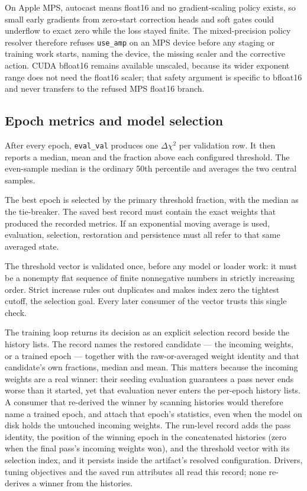 \documentclass[10pt,aps,prd,twocolumn,nofootinbib]{revtex4-2}
\newcommand{\code}[1]{\texttt{#1}}
\begin{document}
On Apple MPS, autocast means float16 and no gradient-scaling policy exists,
so small early gradients from zero-start correction heads and soft gates
could underflow to exact zero while the loss stayed finite.  The
mixed-precision policy resolver therefore refuses \code{use\_amp} on an MPS
device before any staging or training work starts, naming the device, the
missing scaler and the corrective action.  CUDA bfloat16 remains available
unscaled, because its wider exponent range does not need the float16
scaler; that safety argument is specific to bfloat16 and never transfers to
the refused MPS float16 branch.

\subsection{Epoch metrics and model selection}

After every epoch, \code{eval\_val} produces one $\Delta\chi^2$ per validation
row.  It then reports a median, mean and the fraction above each configured
threshold.  The even-sample median is the ordinary 50th percentile and averages
the two central samples.

The best epoch is selected by the primary threshold fraction, with the median
as the tie-breaker.  The saved best record must contain the exact weights that
produced the recorded metrics.  If an exponential moving average is used,
evaluation, selection, restoration and persistence must all refer to that
same averaged state.

The threshold vector is validated once, before any model or loader work: it
must be a nonempty flat sequence of finite nonnegative numbers in strictly
increasing order.  Strict increase rules out duplicates and makes index
zero the tightest cutoff, the selection goal.  Every later consumer of the
vector trusts this single check.

The training loop returns its decision as an explicit selection record
beside the history lists.  The record names the restored candidate — the
incoming weights, or a trained epoch — together with the raw-or-averaged
weight identity and that candidate's own fractions, median and mean.  This
matters because the incoming weights are a real winner: their seeding
evaluation guarantees a pass never ends worse than it started, yet that
evaluation never enters the per-epoch history lists.  A consumer that
re-derived the winner by scanning histories would therefore name a trained
epoch, and attach that epoch's statistics, even when the model on disk
holds the untouched incoming weights.  The run-level record adds the pass
identity, the position of the winning epoch in the concatenated histories
(zero when the final pass's incoming weights won), and the threshold vector
with its selection index, and it persists inside the artifact's resolved
configuration.  Drivers, tuning objectives and the saved run attributes all
read this record; none re-derives a winner from the histories.
\end{document}
